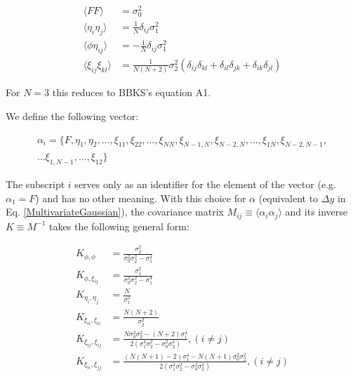 \documentclass[12pt]{article}
\begin{document}
\begin{equation} \label{corr}
\begin{split}
\langle FF \rangle &= \sigma_0^2 \\
\langle\eta_i\eta_j\rangle &= \frac{1}{N}\delta_{ij}\sigma_1^2 \\
\langle\phi\eta_{ij}\rangle &= -\frac{1}{N}\delta_{ij}\sigma_1^2 \\
\langle\xi_{ij}\xi_{kl}\rangle &= \frac{1}{N(N+2)}\sigma_2^2(\delta_{ij}\delta_{kl}+\delta_{il}\delta_{jk}+\delta_{ik}\delta_{jl})
\end{split}
\end{equation}

\noindent For $N=3$ this reduces to BBKS's equation A1. 

We define the following vector:

\begin{equation}
\begin{split}
\alpha_i = \{F,\eta_1,\eta_2,\ldots,\xi_{11},\xi_{22},\ldots,\xi_{NN},\xi_{N-1,N},\xi_{N-2,N},\ldots,\xi_{1N},\xi_{N-2,N-1},\\
\ldots\xi_{1,N-1},\ldots,\xi_{12}\}
\end{split}
\end{equation}

\noindent The subscript $i$ serves only as an identifier for the element of the vector (e.g. $\alpha_1 = F$) and has no other meaning. With this choice for $\alpha$ (equivalent to $\Delta y$ in Eq. \ref{MultivariateGaussian}), the covariance matrix $M_{ij}\equiv\langle\alpha_i\alpha_j\rangle$ and its inverse $K \equiv M^{-1}$ takes the following general form:

\begin{align*}
K_{\phi, \phi} &= \frac{\sigma_2^2}{\sigma_0^2\sigma_2^2-\sigma_1^4} \\
K_{\phi, \xi_{ij}} &= \frac{\sigma_1^2}{\sigma_0^2\sigma_2^2-\sigma_1^4} \\
K_{\eta_i,\eta_j} &= \frac{N}{\sigma_1^2}\\
K_{\xi_{ii},\xi_{ii}} &=  \frac{N(N+2)}{\sigma_2^2} \\
K_{\xi_{ij}, \xi_{ij}} &= \frac{N\sigma_0^2\sigma_2^2-(N+2)\sigma_1^4}{2(\sigma_1^4\sigma_2^2-\sigma_0^2\sigma_2^4)}, (i\neq j)\\
K_{\xi_{ii}, \xi_{jj}} &= \frac{(N(N+1)-2)\sigma_1^4 - N(N+1)\sigma_0^2\sigma_2^2}{2(\sigma_1^4\sigma_2^2-\sigma_0^2\sigma_2^4)}, (i \neq j)\\
\end{align*}
\end{document}
